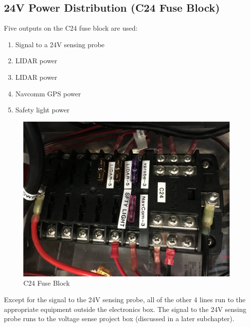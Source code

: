 \subsection{24V Power Distribution (C24 Fuse Block)}

\begin{minipage}{0.6\textwidth}
Five outputs on the C24 fuse block are used:\\
\begin{enumerate}
\item Signal to a 24V sensing probe
\item LIDAR power
\item LIDAR power
\item Navcomm GPS power
\item Safety light power
\end{enumerate}
\end{minipage} \hfill
\begin{minipage}{0.5\textwidth}
\begin{figure}[H]
\centering
\includegraphics[scale=.05, angle=-90]{Photos/C24.jpg}
\caption{\label{fig:C24} C24 Fuse Block}
\end{figure}
\end{minipage}

\bigskip

\noindent  Except for the signal to the 24V sensing probe, all of the other 4 lines run to the appropriate equipment outside the electronics box. The signal to the 24V sensing probe runs to the voltage sense project box (discussed in a later subchapter).

\newpage

